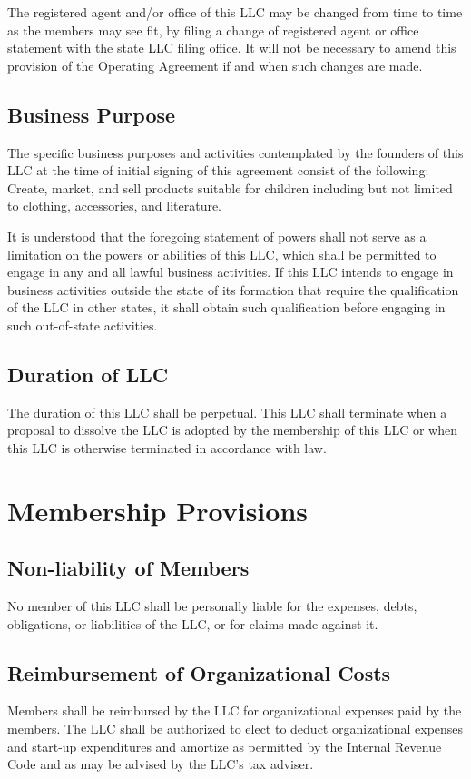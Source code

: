 \documentclass{article}
\begin{document}
			The registered agent and/or office of this LLC may be changed from time to time as the members may see fit, by filing a change of registered agent or office statement with the state LLC filing office. It will not be necessary to amend this provision of the Operating Agreement if and when such changes are made.

			\subsection{Business Purpose}
			The specific business purposes and activities contemplated by the founders of this LLC at the time of initial signing of this agreement consist of the following: Create, market, and sell products suitable for children including but not limited to clothing, accessories, and literature.
			
			\indent It is understood that the foregoing statement of powers shall not serve as a limitation on the powers or abilities of this LLC, which shall be permitted to engage in any and all lawful business activities. If this LLC intends to engage in business activities outside the state of its formation that require the qualification of the LLC in other states, it shall obtain such qualification before engaging in such out-of-state activities.

			\subsection{Duration of LLC}
			The duration of this LLC shall be perpetual. This LLC shall terminate when a proposal to dissolve the LLC is adopted by the membership of this LLC or when this LLC is otherwise terminated in accordance with law.
		

	\section{Membership Provisions}

			\subsection{Non-liability of Members}
			No member of this LLC shall be personally liable for the expenses, debts, obligations, or liabilities of the LLC, or for claims made against it.

			\subsection{Reimbursement of Organizational Costs}
			Members shall be reimbursed by the LLC for organizational expenses paid by the members. The LLC shall be authorized to elect to deduct organizational expenses and start-up expenditures and amortize as permitted by the Internal Revenue Code and as may be advised by the LLC's tax adviser.
\end{document}
